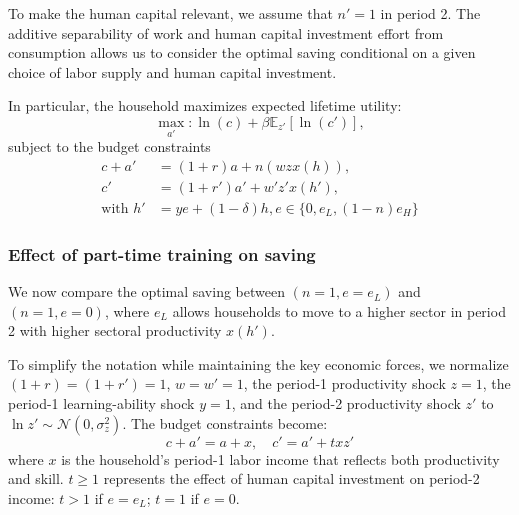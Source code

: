 \documentclass[12pt,english]{article}
\numberwithin{equation}{section}
\begin{document}
To make the human capital relevant, we assume that $n'=1$ in period 2. The additive separability of work and human capital investment effort from consumption allows us to consider the optimal saving conditional on a given choice of labor supply and human capital investment. 

In particular, the household maximizes expected lifetime utility:   
\begin{equation}\label{eq:savingprob}
\max_{a'} : \ln(c) + \beta \mathbb{E}_{z'}[\ln(c')],
\end{equation}
subject to the budget constraints
\begin{align}
c + a' &= (1+r)a + n(wzx(h)) , \\
c' &= (1+r')a' + w'z'x(h'), \\
\text{with } h' &= ye + (1-\delta)h, e \in \{0, e_L, (1-n)e_H\}
\end{align}

\subsubsection{Effect of part-time training on saving}\label{sec:part-time-saving}
We now compare the optimal saving between $(n=1,e=e_L)$ and $(n=1,e=0)$, where $e_L$ allows households to move to a higher sector in period 2 with higher sectoral productivity $x(h')$. 

To simplify the notation while maintaining the key economic forces, we normalize $(1+r)=(1+r')= 1$, $w=w'= 1$, the period-1 productivity shock $z=1$, the period-1 learning-ability shock $y=1$, and the period-2 productivity shock $z'$ to $\ln z' \sim \mathcal{N}(0,\sigma_z^2)$. The budget constraints become:
\begin{equation}
c + a' = a + x , \quad c' = a' + txz'
\end{equation}
where $x$ is the household's period-1 labor income that reflects both productivity and skill. $t\geq 1$ represents the effect of human capital investment on period-2 income: $t>1$ if $e=e_L$; $t=1$ if $e=0$.
\end{document}
